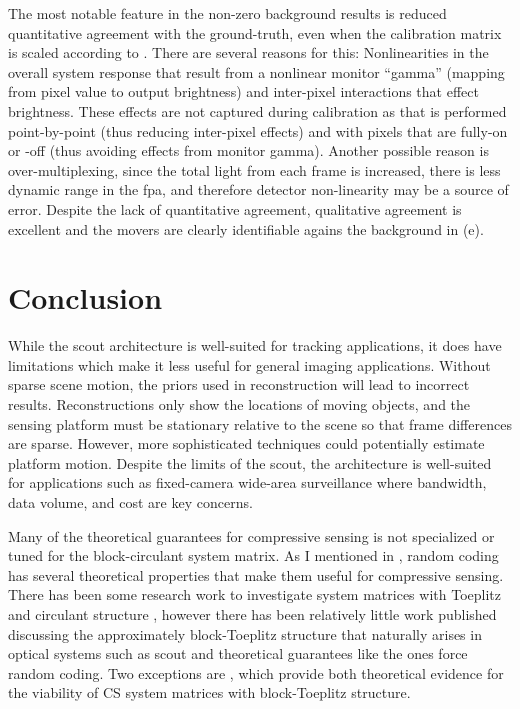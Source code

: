 The most notable feature in the non-zero background results is reduced quantitative agreement with the ground-truth, even when the calibration matrix is scaled according to . There are several reasons for this: Nonlinearities in the overall system response that result from a nonlinear monitor “gamma” (mapping from pixel value to output brightness) and inter-pixel interactions that effect brightness. These effects are not captured during calibration as that is performed point-by-point (thus reducing inter-pixel effects) and with pixels that are fully-on or -off (thus avoiding effects from monitor gamma). Another possible reason is over-multiplexing, since the total light from each frame is increased, there is less dynamic range in the \gls{fpa}, and therefore detector non-linearity may be a source of error. Despite the lack of quantitative agreement, qualitative agreement is excellent and the movers are clearly identifiable agains the background in (e).



\section{Conclusion}

While the \gls{scout} architecture is well-suited for tracking applications, it does have limitations which make it less useful for general imaging applications. Without sparse scene motion, the priors used in reconstruction will lead to incorrect results. Reconstructions only show the locations of moving objects, and the sensing platform must be stationary relative to the scene so that frame differences are sparse. However, more sophisticated techniques could potentially estimate platform motion. Despite the limits of the \gls{scout}, the architecture is well-suited for applications such as fixed-camera wide-area surveillance where bandwidth, data volume, and cost are key concerns.

Many of the theoretical guarantees for \gls{compressive sensing} is not specialized or tuned for the block-circulant system matrix. As I mentioned in , random coding has several theoretical properties that make them useful for compressive sensing. There has been some research work to investigate system matrices with Toeplitz and circulant structure \cite{bajwa2007toeplitz, rauhut2009circulant, romberg2009compressive}, however there has been relatively little work published discussing the approximately block-Toeplitz structure that naturally arises in optical systems such as \gls{scout} and theoretical guarantees like the ones force random coding. Two exceptions are \cite{sebert2008toeplitz, liu2008sparsesense}, which provide both theoretical evidence for the viability of CS system matrices with block-Toeplitz structure.


